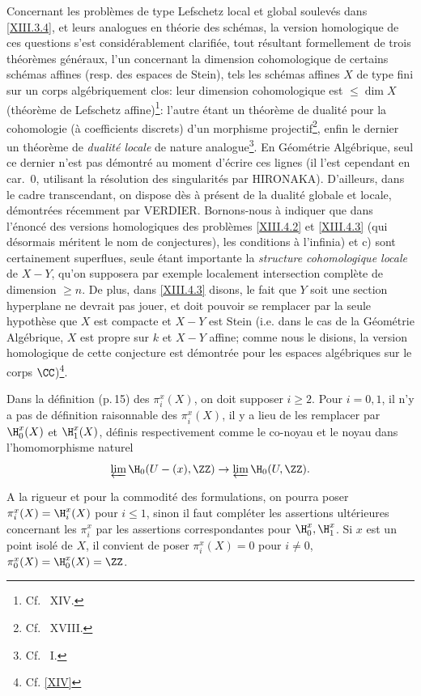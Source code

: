 Concernant les probl\`emes de type Lefschetz local et global soulev\'es dans \ref{XIII.3.4}, et leurs analogues en th\'eorie des sch\'emas, la version homologique de ces questions s'est consid\'erablement clarifi\'ee, tout r\'esultant formellement de trois th\'eor\`emes g\'en\'eraux, l'un concernant la dimension cohomologique de certains sch\'emas affines (resp. des espaces de Stein), tels les sch\'emas affines $X$ de type fini sur un corps alg\'ebriquement clos: leur dimension cohomologique est $\leq\dim X$ (\og th\'eor\`eme de Lefschetz affine{\fg})\footnote{Cf. ~XIV.}: l'autre \'etant un th\'eor\`eme de dualit\'e pour la cohomologie (\`a coefficients discrets) d'un morphisme projectif\footnote{Cf. ~XVIII.}, enfin le dernier un th\'eor\`eme de \emph{dualité locale} de nature analogue\footnote{Cf. ~I.}. En G\'eom\'etrie Alg\'ebrique, seul ce dernier n'est pas d\'emontr\'e au moment d'\'ecrire ces lignes (il l'est cependant en car.~$0$, utilisant la r\'esolution des singularit\'es par HIRONAKA). D'ailleurs, dans le cadre transcendant, on dispose d\`es \`a pr\'esent de la dualit\'e globale et locale, d\'emontr\'ees r\'ecemment par VERDIER. Bornons-nous \`a indiquer que dans l'\'enonc\'e des versions homologiques des probl\`emes \ref{XIII.4.2} et \ref{XIII.4.3} (qui d\'esormais m\'eritent le nom de conjectures), les conditions \og \`a l'infini\fg a) et c) sont certainement superflues, seule \'etant importante la \emph{structure cohomologique locale} de $X-Y$, qu'on supposera par exemple localement intersection compl\`ete de dimension $\geq n$. De plus, dans \ref{XIII.4.3} disons, le fait que $Y$ soit une section hyperplane ne devrait pas jouer, et doit pouvoir se remplacer par la seule hypoth\`ese que $X$ est compacte et $X-Y$ est Stein (i.e. dans le cas de la G\'eom\'etrie Alg\'ebrique, $X$ est propre sur $k$ et $X-Y$ affine; comme nous le disions, la version homologique de cette conjecture est d\'emontr\'ee pour les espaces alg\'ebriques sur le corps $\CC$)\footnote{Cf. \Exp \ref{XIV}}.

\label{p25y}%
Dans la d\'efinition (p.\,15) des $\pi_i^x(X)$, on doit supposer $i\geq 2$. Pour $i=0, 1$, il n'y a pas de d\'efinition raisonnable des $\pi_i^x(X)$, il y a lieu de les remplacer par $\H_0^x(X)$ et $\H_1^x(X)$, d\'efinis respectivement comme le co-noyau et le noyau dans l'homomorphisme naturel
$$
\varprojlim \H_0(U-(x), \ZZ)\to\varprojlim\H_0(U, \ZZ).
$$

A la rigueur et pour la commodit\'e des formulations, on pourra poser $\pi_i^x(X)=\H_i^x(X)$ pour $i\leq 1$, sinon il faut compl\'eter les assertions ult\'erieures concernant les $\pi_i^x$ par les assertions correspondantes pour $\H_0^x, \H_1^x$. Si $x$ est un point isol\'e de $X$, il convient de poser $\pi_i^x(X)=0$ pour $i\neq 0$, $\pi_0^x(X)=\H_0^x(X)=\ZZ$.

